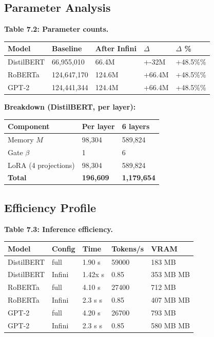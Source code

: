 \subsection{Parameter Analysis}

\textbf{Table 7.2: Parameter counts.}

\begin{table}[H]
\centering
\small
\begin{tabular}{lllll}
\toprule
\textbf{Model} & \textbf{Baseline} & \textbf{After Infini} & \textbf{$\Delta$} & \textbf{$\Delta$ \%} \\
\midrule
DistilBERT & 66,955,010 & 66.4M & +-32M & +48.5\%\% \\
RoBERTa & 124,647,170 & 124.6M & +66.4M & +48.5\%\% \\
GPT-2 & 124,441,344 & 124.4M & +66.4M & +48.5\%\% \\
\bottomrule
\end{tabular}
\end{table}

\textbf{Breakdown (DistilBERT, per layer):}

\begin{table}[H]
\centering
\small
\begin{tabular}{lll}
\toprule
\textbf{Component} & \textbf{Per layer} & \textbf{6 layers} \\
\midrule
Memory $M$ & 98,304 & 589,824 \\
Gate $\beta$ & 1 & 6 \\
LoRA (4 projections) & 98,304 & 589,824 \\
\textbf{Total} & \textbf{196,609} & \textbf{1,179,654} \\
\bottomrule
\end{tabular}
\end{table}

\subsection{Efficiency Profile}

\textbf{Table 7.3: Inference efficiency.}

\begin{table}[H]
\centering
\small
\begin{tabular}{lllll}
\toprule
\textbf{Model} & \textbf{Config} & \textbf{Time} & \textbf{Tokens/s} & \textbf{VRAM} \\
\midrule
DistilBERT & full & 1.90 s & 59000 & 183 MB \\
DistilBERT & Infini & 1.42x s & 0.85 & 353 MB MB \\
RoBERTa & full & 4.10 s & 27400 & 712 MB \\
RoBERTa & Infini & 2.3 s s & 0.85 & 407 MB MB \\
GPT-2 & full & 4.20 s & 26700 & 793 MB \\
GPT-2 & Infini & 2.3 s s & 0.85 & 580 MB MB \\
\bottomrule
\end{tabular}
\end{table}

